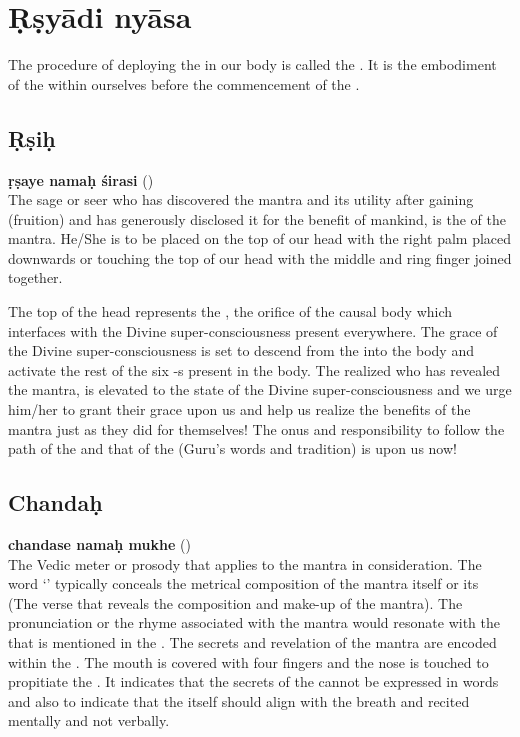 \documentclass[twoside]{xarticle}
\begin{document}
\section{Ṛṣyādi nyāsa}

The procedure of deploying the  in our body is called
the . It is the embodiment of the  within
ourselves before the commencement of the .

\subsection{Ṛṣiḥ}

\textbf{ṛṣaye namaḥ śirasi} ()\\
The sage or seer who has discovered the mantra and its utility after gaining
 (fruition) and has generously disclosed it for the benefit of
mankind, is the  of the mantra. He/She is to be placed on the top of
our head with the right palm placed downwards or touching the top of our head
with the middle and ring finger joined together.

The top of the head represents the , the orifice of the causal
body which interfaces with the Divine super-consciousness present everywhere.
The grace of the Divine super-consciousness is set to descend from
the  into the body and activate the rest of the six -s
present in the body. The realized  who has revealed the mantra,
is elevated to the state of the Divine super-consciousness and we urge him/her
to grant their grace upon us and help us realize the benefits of the mantra
just as they did for themselves! The onus and responsibility to follow
the path of the  and that of the  (Guru’s words and
tradition) is upon us now!

\subsection{Chandaḥ}

\textbf{chandase namaḥ mukhe} ()\\
The Vedic meter or prosody that applies to the mantra in consideration. The word
‘’ typically conceals the metrical composition of the mantra itself
or its  (The verse that reveals the composition and make-up
of the mantra). The pronunciation or the rhyme associated with the mantra would
resonate with the  that is mentioned in the .
The secrets and revelation of the mantra are encoded within the .
The mouth is covered with four fingers and the nose is touched to propitiate
the . It indicates that the secrets of the  cannot be
expressed in words and also to indicate that the  itself should
align with the breath and recited mentally and not verbally.
\end{document}
